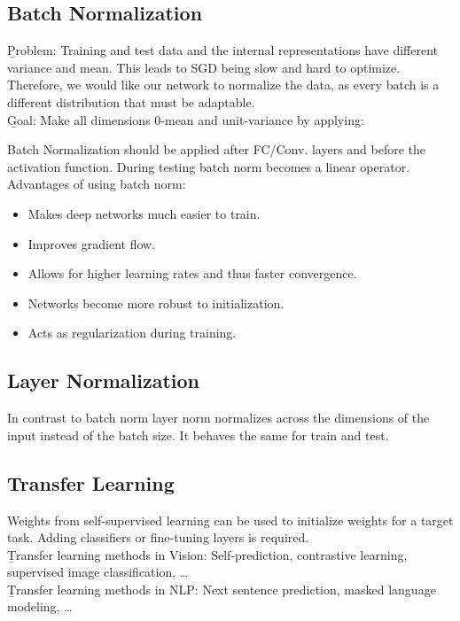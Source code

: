 \subsection{Batch Normalization}
\b{Problem:} Training and test data and the internal representations have different variance and mean. This leads to SGD being slow and hard to optimize. Therefore, we would like our network to normalize the data, as every batch is a different distribution that must be adaptable.\\

\b{Goal:} Make all dimensions 0-mean and unit-variance by applying:

Batch Normalization should be applied after FC/Conv. layers and before the activation function. During testing batch norm becomes a linear operator.\\

Advantages of using batch norm:
\begin{itemize}
    \item Makes deep networks much easier to train.
    \item Improves gradient flow.
    \item Allows for higher learning rates and thus faster convergence.
    \item Networks become more robust to initialization.
    \item Acts as regularization during training.
\end{itemize}

\subsection{Layer Normalization}
In contrast to batch norm layer norm normalizes across the dimensions of the input instead of the batch size. It behaves the same for train and test.

\subsection{Transfer Learning}
Weights from self-supervised learning can be used to initialize weights for a target task. Adding classifiers or fine-tuning layers is required.\\

\b{Transfer learning methods in Vision:} Self-prediction, contrastive learning, supervised image classification, \dots\\
\b{Transfer learning methods in NLP:} Next sentence prediction, masked language modeling, \dots

